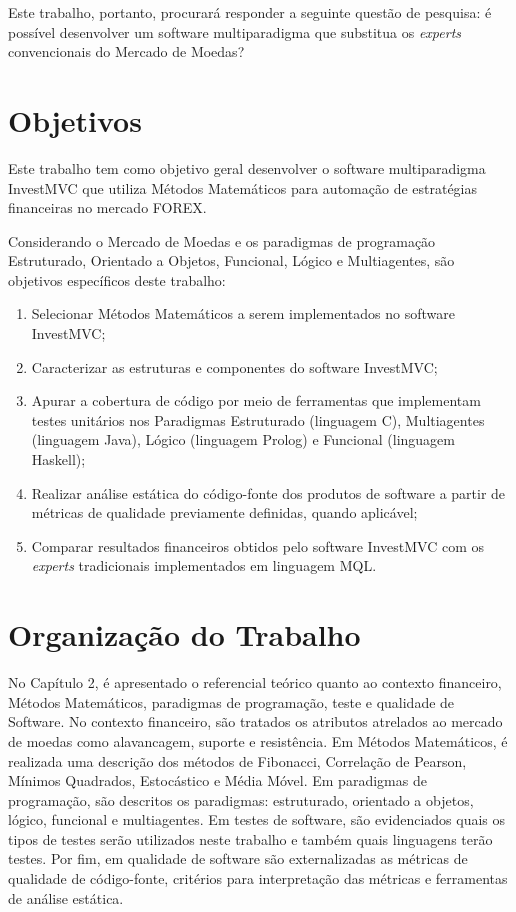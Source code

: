 Este trabalho, portanto, procurará responder a seguinte questão de pesquisa: é possível desenvolver um software multiparadigma que substitua os \textit{experts} convencionais do Mercado de Moedas?

\section{Objetivos}
Este trabalho tem como objetivo geral desenvolver o software multiparadigma InvestMVC que utiliza Métodos Matemáticos para automação de estratégias financeiras no mercado FOREX.

Considerando o Mercado de Moedas e os paradigmas de programação Estruturado, Orientado a Objetos, Funcional, Lógico e Multiagentes, são objetivos específicos deste trabalho:

\begin{enumerate}
\item  Selecionar Métodos Matemáticos a serem implementados no software InvestMVC;

\item Caracterizar as estruturas e componentes do software InvestMVC;

\item Apurar a cobertura de código por meio de ferramentas que implementam testes unitários nos Paradigmas Estruturado (linguagem C), Multiagentes (linguagem Java), Lógico (linguagem Prolog) e Funcional (linguagem Haskell);

\item  Realizar análise estática do código-fonte dos produtos de software a partir de métricas de qualidade previamente definidas, quando aplicável;

\item Comparar resultados financeiros obtidos pelo software InvestMVC com os \textit{experts} tradicionais implementados em linguagem MQL.
\end{enumerate}

\section{Organização do Trabalho}
No Capítulo 2, é apresentado o referencial teórico quanto ao contexto financeiro, Métodos Matemáticos, paradigmas de programação, teste e qualidade de Software. No contexto financeiro, são tratados os atributos atrelados ao mercado de moedas como alavancagem, suporte e resistência. Em Métodos Matemáticos, é realizada uma descrição dos métodos de Fibonacci, Correlação de Pearson, Mínimos Quadrados, Estocástico e Média Móvel. Em paradigmas de programação, são descritos os paradigmas: estruturado, orientado a objetos, lógico, funcional e multiagentes. Em testes de software, são evidenciados quais os tipos de testes serão utilizados neste trabalho e também quais linguagens terão testes. Por fim, em qualidade de software são externalizadas as métricas de qualidade de código-fonte, critérios para interpretação das métricas e ferramentas de análise estática.

